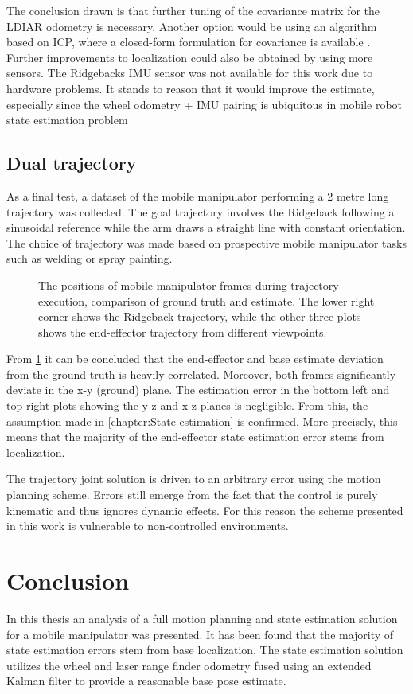 \documentclass[times, utf8, diplomski, english]{fer}
\begin{document}
The conclusion drawn is that further tuning of the covariance matrix for the LDIAR odometry is necessary.
Another option would be using an algorithm based on ICP, where a closed-form formulation for covariance is available \citep{censi2007accurate}.
Further improvements to localization could also be obtained by using more sensors. 
The Ridgebacks IMU sensor was not available for this work due to hardware problems.
It stands to reason that it would improve the estimate, especially since the wheel odometry + IMU pairing is ubiquitous in mobile robot state estimation problem 

\section{Dual trajectory}
As a final test, a dataset of the mobile manipulator performing a 2 metre long trajectory was collected.
The goal trajectory involves the Ridgeback following a sinusoidal reference while the arm draws a straight line with constant orientation.
The choice of trajectory was made based on prospective mobile manipulator tasks such as welding or spray painting.
\begin{figure}[h]
\centering

\caption{The positions of mobile manipulator frames during trajectory execution, comparison of ground truth and estimate.
The lower right corner shows the Ridgeback trajectory, while the other three plots shows the end-effector trajectory from different viewpoints.}
\label{fig:dual_trajectory}
\end{figure}

From \ref{fig:dual_trajectory} it can be concluded that the end-effector and base estimate deviation from the ground truth is heavily correlated.
Moreover, both frames significantly deviate in the x-y (ground) plane.
The estimation error in the bottom left and top right plots showing the y-z and x-z planes is negligible.
From this, the assumption made in \ref{chapter:State estimation} is confirmed.
More precisely, this means that the majority of the end-effector state estimation error stems from localization.

The trajectory joint solution is driven to an arbitrary error using the motion planning scheme.
Errors still emerge from the fact that the control is purely kinematic and thus ignores dynamic effects.
For this reason the scheme presented in this work is vulnerable to non-controlled environments.


\chapter{Conclusion}
In this thesis an analysis of a full motion planning and state estimation solution for a mobile manipulator was presented.
It has been found that the majority of state estimation errors stem from base localization.
The state estimation solution utilizes the wheel and laser range finder odometry fused using an extended Kalman filter to provide a reasonable base pose estimate. 
\end{document}
